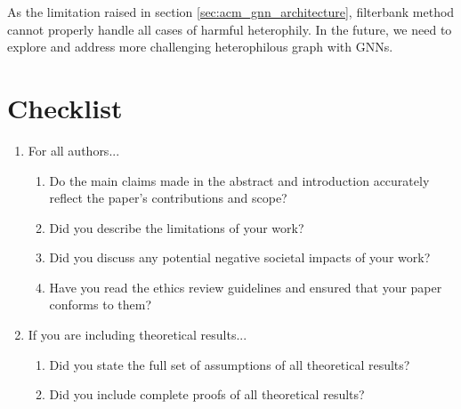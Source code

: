 \documentclass{article}
\newcommand{\0}{{\boldsymbol{0}}}
\newcommand{\6}{{\partial}}
\newcommand{\8}{{\infty}}
\newcommand{\4}{{\nabla}}
\begin{document}
As the limitation raised in section \ref{sec:acm_gnn_architecture}, filterbank method cannot properly handle all cases of harmful heterophily. In the future, we need to explore and address more challenging heterophilous graph with GNNs.


\clearpage




\clearpage
\section*{Checklist}

\begin{enumerate}

\item For all authors...
\begin{enumerate}
  \item Do the main claims made in the abstract and introduction accurately reflect the paper's contributions and scope?
    \answerYes{}
  \item Did you describe the limitations of your work?
  \item Did you discuss any potential negative societal impacts of your work?
  \item Have you read the ethics review guidelines and ensured that your paper conforms to them?
    \answerYes{}
\end{enumerate}

\item If you are including theoretical results...
\begin{enumerate}
  \item Did you state the full set of assumptions of all theoretical results?
    \item Did you include complete proofs of all theoretical results?
    \end{enumerate}


\end{enumerate}
\end{document}
